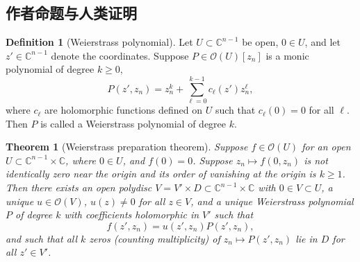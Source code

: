 \documentclass[UTF8,11pt]{ctexart}
\newtheorem*{theorem}{Theorem}
\theoremstyle{definition}
\newtheorem*{definition}{Definition}
\newcommand{\C}{\mathbb C}
\newcommand{\sO}{\mathscr O}
\begin{document}
\subsection*{作者命题与人类证明}
\begin{definition}[Weierstrass polynomial]
Let $U\subset\C^{n-1}$ be open, $0\in U$, and let $z'\in\C^{n-1}$ denote the coordinates. Suppose $P\in\sO(U)[z_n]$ is a monic polynomial of degree $k\geq0$,
\[
P(z',z_n)=z_n^k+\sum_{\ell=0}^{k-1}c_\ell(z')z_n^\ell,
\]
where $c_\ell$ are holomorphic functions defined on $U$ such that $c_\ell(0)=0$ for all $\ell$. Then $P$ is called a Weierstrass polynomial of degree $k$.
\end{definition}
\begin{theorem}[Weierstrass preparation theorem]
Suppose $f\in\sO(U)$ for an open $U\subset\C^{n-1}\times\C$, where $0\in U$, and $f(0)=0$. Suppose $z_n\mapsto f(0,z_n)$ is not identically zero near the origin and its order of vanishing at the origin is $k\geq1$. Then there exists an open polydisc $V=V'\times D\subset\C^{n-1}\times\C$ with $0\in V\subset U$, a unique $u\in\sO(V)$, $u(z)\neq0$ for all $z\in V$, and a unique Weierstrass polynomial $P$ of degree $k$ with coefficients holomorphic in $V'$ such that
\[
f(z',z_n)=u(z',z_n)P(z',z_n),
\]
and such that all $k$ zeros (counting multiplicity) of $z_n\mapsto P(z',z_n)$ lie in $D$ for all $z'\in V'$.
\end{theorem}
\end{document}
